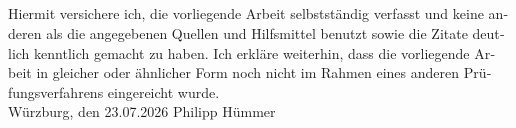 \newpage
\begin{otherlanguage}{ngerman}
\thispagestyle{empty}
\section*{}
\thispagestyle{empty}
Hiermit versichere ich, die vorliegende Arbeit selbstständig verfasst und keine anderen als die angegebenen Quellen und Hilfsmittel benutzt sowie die Zitate deutlich kenntlich gemacht zu haben.
\newline
Ich erkläre weiterhin, dass die vorliegende Arbeit in gleicher oder ähnlicher Form noch nicht im Rahmen eines
anderen Prüfungsverfahrens eingereicht wurde.
\vspace{4\baselineskip}\\
Würzburg, den 23.07.2026 \hfill Philipp Hümmer
\vspace{4\baselineskip}\\
\end{otherlanguage}